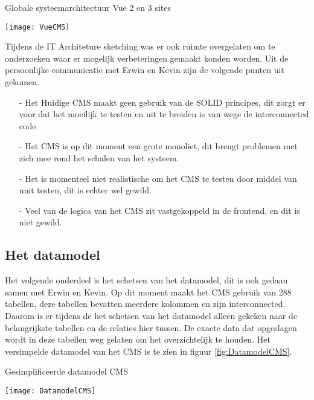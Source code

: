 \begin{graphic}
	\captionsetup{type=figure}
	\caption{Globale systeemarchitectuur Vue 2 en 3 sites}
    \texttt{[image: VueCMS]}
	\label{fig:SystemArchitectureVue}
\end{graphic}

\whitespace
Tijdens de IT Architeture sketching was er ook ruimte overgelaten om te onderzoeken waar er mogelijk verbeteringen gemaakt konden worden.
Uit de persoonlijke communicatie met Erwin en Kevin zijn de volgende punten uit gekomen.
\begin{itemize}
	\item[-]{Het Huidige \gls{CMS} maakt geen gebruik van de SOLID principes, dit zorgt er voor dat het moeilijk te testen en uit te breiden is van wege de interconnected code}
	\item[-]{Het \gls{CMS} is op dit moment een grote monoliet, dit brengt problemen met zich mee rond het schalen van het systeem.}
	\item[-]{Het is momenteel niet realistische om het \gls{CMS} te testen door middel van unit testen, dit is echter wel gewild.}
    \item[-]{Veel van de logica van het CMS zit vastgekoppeld in de frontend, en dit is niet gewild.}
\end{itemize}

\newpage
\subsection{Het datamodel}
Het volgende onderdeel is het schetsen van het datamodel, dit is ook gedaan samen met Erwin en Kevin.
Op dit moment maakt het \gls{CMS} gebruik van 288 tabellen, deze tabellen bevatten meerdere kolommen en zijn interconnected.
Daarom is er tijdens de het schetsen van het datamodel alleen gekeken naar de belangrijkste tabellen en de relaties hier tussen.
De exacte data dat opgeslagen wordt in deze tabellen weg gelaten om het overzichtelijk te houden.
Het versimpelde datamodel van het CMS is te zien in figuur \ref{fig:DatamodelCMS}.

\begin{graphic}
	\captionsetup{type=figure}
	\caption{Gesimplificeerde datamodel CMS}
	\texttt{[image: DatamodelCMS]}
	\label{fig:DatamodelCMS}
\end{graphic}

